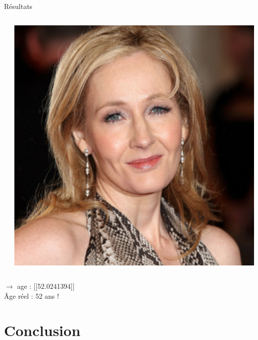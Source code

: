 \documentclass[compress]{beamer}
\begin{document}
\begin{frame}{Résultats}
  \begin{columns}
    \begin{column}{0.6\linewidth}
      \inputminted[fontsize=\scriptsize]{python}{code6.py}
    \end{column}
    \begin{column}{0.4\linewidth}
      \centering
      \includegraphics[width=\linewidth]{resources/JKrowling}
    \end{column}
  \end{columns}
    $\rightarrow$ age : [[52.0241394]]\\
    Âge réel : 52 ans !
\end{frame}

\subsection{}

\section{Conclusion}
\end{document}
